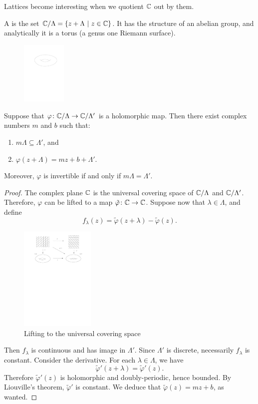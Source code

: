 Lattices become interesting when we quotient $\mathbb{C}$ out by them.
\begin{definition}
  A  is the set $\mathbb{C}/\Lambda =\{z+\Lambda~|~ z\in\mathbb{C}\}$. It has the structure of an abelian group, and analytically it is a torus (a genus one Riemann surface).
\end{definition}
\begin{figure}
\begin{center}
\includegraphics[height=3cm]{torus.pdf}
\end{center}
\label{fig:torus}
\end{figure}
\begin{proposition}
  Suppose that $\varphi\colon\mathbb{C}/\Lambda\to\mathbb{C}/\Lambda'$ is a holomorphic map. Then there exist complex numbers $m$ and $b$ such that:
  \begin{enumerate}
  \item $m\Lambda\subseteq \Lambda'$, and
  \item $\varphi(z+\Lambda)=mz+b+\Lambda'$.
  \end{enumerate}
Moreover, $\varphi$ is invertible if and only if $m\Lambda=\Lambda'$.
\end{proposition}
\begin{proof}
 The complex plane $\mathbb{C}$ is the universal covering space of $\mathbb{C}/\Lambda$ and $\mathbb{C}/\Lambda'$. Therefore, $\varphi$ can be lifted to a map $\tilde\varphi\colon\mathbb{C}\to\mathbb{C}$. Suppose now that $\lambda\in\Lambda$, and define
\[
f_\lambda(z)=\tilde\varphi(z+\lambda)-\tilde\varphi(z).
\]
\begin{figure}[h]
  \centering
  \includegraphics[height=5cm]{Pictures/universal_covering_space.pdf}

  \caption{Lifting to the universal covering space}
  \label{fig:universal-covering-space}
\end{figure}
Then $f_\lambda$ is continuous and has image in $\Lambda'$. Since $\Lambda'$ is discrete, necessarily $f_\lambda$ is constant. Consider the derivative. For each $\lambda\in\Lambda$, we have
\[
\tilde\varphi'(z+\lambda)=\tilde\varphi'(z).
\]
Therefore $\tilde\varphi'(z)$ is holomorphic and doubly-periodic, hence bounded. By Liouville's theorem, $\tilde\varphi'$ is constant. We deduce that $\tilde\varphi(z)=mz+b$, as wanted.
\end{proof}

